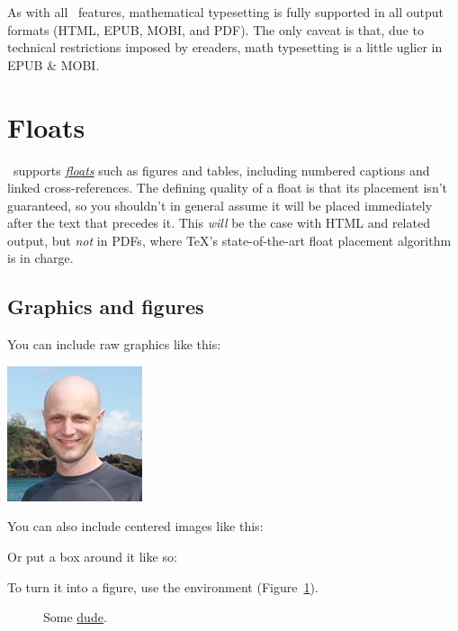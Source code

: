 As with all \PolyTeXnic\ features, mathematical typesetting is fully supported in all output formats (HTML, EPUB, MOBI, and PDF). The only caveat is that, due to technical restrictions imposed by ereaders, math typesetting is a little uglier in EPUB \& MOBI.

\section{Floats}
\label{sec:floats}

\PolyTeXnic\ supports \href{http://en.wikibooks.org/wiki/LaTeX/Floats,_Figures_and_Captions}{\emph{floats}} such as figures and tables, including numbered captions and linked cross-references. The defining quality of a float is that its placement isn't guaranteed, so you shouldn't in general assume it will be placed immediately after the text that precedes it. This \emph{will} be the case with HTML and related output, but \emph{not} in PDFs, where \TeX's state-of-the-art float placement algorithm is in charge.

\subsection{Graphics and figures}
\label{sec:graphics_and_figures}

You can include raw graphics like this:

\includegraphics{images/2011_michael_hartl.png}

\noindent You can also include centered images like this:


\noindent Or put a box around it like so:


To turn it into a figure, use the  environment (Figure~\ref{fig:the_dude}).

\begin{figure}
\caption{Some \href{http://michaelhartl.com/}{dude}.\label{fig:the_dude}}
\end{figure}

